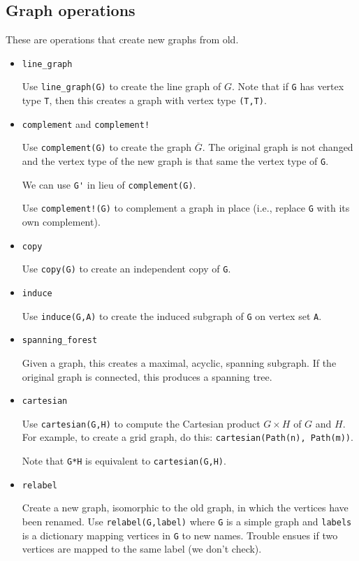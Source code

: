 \documentclass[oneside]{amsart}
\begin{document}
\subsection*{Graph operations}
These are operations that create new graphs from old.

\begin{itemize}

\item \verb|line_graph|

  Use \verb|line_graph(G)| to create the line graph of $G$. Note that
  if \verb|G| has vertex type \verb|T|, then this creates a graph with
  vertex type \verb|(T,T)|.

\item \verb|complement| and \verb|complement!|

  Use \verb|complement(G)| to create the graph $\overline{G}$. The
  original graph is not changed and the vertex type of the new graph
  is that same the vertex type of \verb|G|.

  We can use \verb|G'| in lieu of \verb|complement(G)|.

  Use \verb|complement!(G)| to complement a graph in place (i.e.,
  replace \verb|G| with its own complement).


\item \verb|copy|

  Use \verb|copy(G)| to create an independent copy of \verb|G|.

\item \verb|induce|

  Use \verb|induce(G,A)| to create the induced subgraph of \verb|G| on
  vertex set \verb|A|.

\item \verb|spanning_forest|

  Given a graph, this creates a maximal, acyclic, spanning
  subgraph. If the original graph is connected, this produces a
  spanning tree.


\item \verb|cartesian|

  Use \verb|cartesian(G,H)| to compute the Cartesian product $G\times
  H$ of $G$ and $H$. For example, to create a grid graph, do this:
  \verb|cartesian(Path(n), Path(m))|.

  Note that \verb|G*H| is equivalent to \verb|cartesian(G,H)|.

\item \verb|relabel|

  Create a new graph, isomorphic to the old graph, in which the
  vertices have been renamed. Use \verb|relabel(G,label)| where
  \verb|G| is a simple graph and \verb|labels| is a dictionary mapping
  vertices in \verb|G| to new names. Trouble ensues if two vertices
  are mapped to the same label (we don't check).


\end{itemize}
\end{document}
